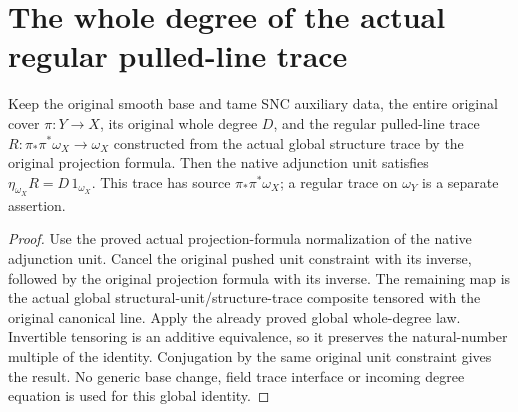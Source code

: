 \section{The whole degree of the actual regular pulled-line trace}

\begin{lemma}
\label{lem:kn-canonical-regular-pulled-line-native-unit-degree}
\leanok
Keep the original smooth base and tame SNC auxiliary data, the entire
original cover $\pi:Y\to X$, its original whole degree $D$, and the
regular pulled-line trace $R:\pi_*\pi^*\omega_X\to\omega_X$ constructed
from the actual global structure trace by the original projection formula.
Then the native adjunction unit satisfies $\eta_{\omega_X}R=D\,1_{\omega_X}$.
This trace has source $\pi_*\pi^*\omega_X$; a regular trace on $\omega_Y$
is a separate assertion.
\end{lemma}
\begin{proof}
Use the proved actual projection-formula normalization of the native
adjunction unit. Cancel the original pushed unit constraint with its
inverse, followed by the original projection formula with its inverse.
The remaining map is the actual global structural-unit/structure-trace
composite tensored with the original canonical line. Apply the already
proved global whole-degree law. Invertible tensoring is an additive
equivalence, so it preserves the natural-number multiple of the identity.
Conjugation by the same original unit constraint gives the result.
No generic base change, field trace interface or incoming degree equation
is used for this global identity.
\end{proof}

